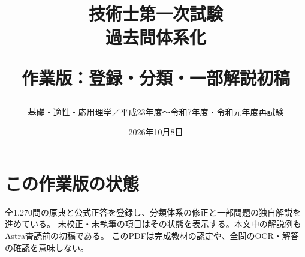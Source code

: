 \documentclass[a4paper,10pt,openany]{ltjsbook}
\title{技術士第一次試験\\過去問体系化\par\large 作業版：登録・分類・一部解説初稿}
\author{基礎・適性・応用理学／平成23年度〜令和7年度・令和元年度再試験}
\date{2026年10月8日}
\begin{document}
\maketitle
\frontmatter
\chapter*{この作業版の状態}
全1,270問の原典と公式正答を登録し、分類体系の修正と一部問題の独自解説を進めている。
未校正・未執筆の項目はその状態を表示する。本文中の解説例もAstra査読前の初稿である。
このPDFは完成教材の認定や、全問のOCR・解答の確認を意味しない。
\tableofcontents
\mainmatter












\appendix







\printbibliography[heading=bibintoc,title={参照資料}]
\end{document}
